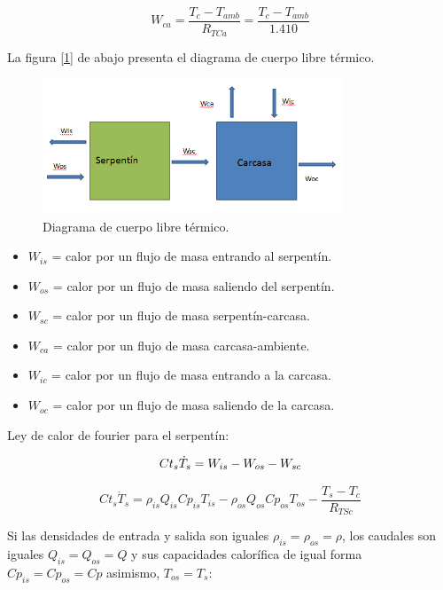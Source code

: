 \documentclass[12pt,letterpaper]{article}     %
\begin{document}
\begin{equation}
W_{ca} = \frac{T_{c} - T_{amb}}{R_{TCa}} = \frac{T_{c} - T_{amb}}{1.410} \label{eq:resistor car-amb}
\end{equation} 

La figura [\ref{fig:DCLtermico}] de abajo presenta el diagrama de cuerpo libre térmico.


\begin{figure}[H]
\centering
\includegraphics[width=0.8\textwidth]{Imagines/DCLtermico.png}
\caption{Diagrama de cuerpo libre térmico.}
\label{fig:DCLtermico}
\end{figure}

\begin{itemize}
    \item $W_{is}$ = calor por un flujo de masa entrando al serpentín. 
    \item $W_{os}$ = calor por un flujo de masa saliendo del serpentín.
    \item $W_{sc}$ = calor por un flujo de masa serpentín-carcasa.
    \item $W_{ca}$ = calor por un flujo de masa carcasa-ambiente.
    \item $W_{ic}$ = calor por un flujo de masa entrando a la carcasa.
    \item $W_{oc}$ = calor por un flujo de masa saliendo de la  carcasa.
\end{itemize}

Ley de calor de fourier para el serpentín:

\begin{equation} 
Ct_{s} \dot T_{s} = W_{is} - W_{os} - W_{sc}\\
\end{equation} 

\begin{equation} 
Ct_{s} \dot T_{s} = \rho_{is}Q_{is}Cp_{is}T_{is} - \rho_{os}Q_{os}Cp_{os}T_{os} - \frac{T_{s}-T_{c}}{R_{TSc}}
\end{equation} 

Si las densidades de entrada y salida son iguales $\rho_{is} = \rho_{os} = \rho$, los caudales son iguales $Q_{is} = Q_{os} = Q $ y sus capacidades calorífica de igual forma $Cp_{is} = Cp_{os} = Cp$ asimismo, $T_{os} = T_{s}$:
\end{document}
